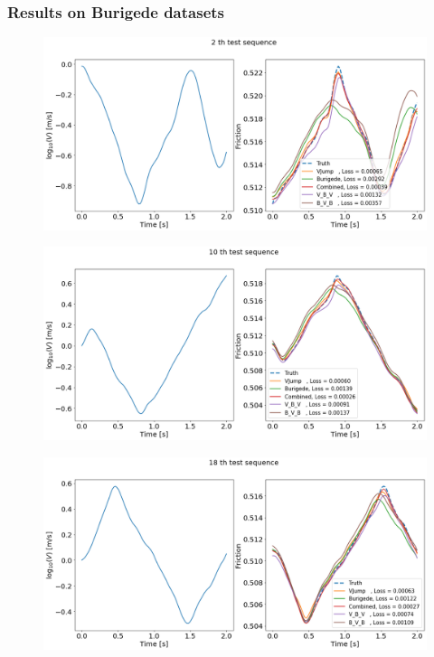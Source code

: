 \subsubsection{Results on Burigede datasets}
\begin{figure}[H]
    \centering
    \includegraphics[width=1.0\textwidth]{./images/Trial0112_Burigede2.png}
\end{figure}
\begin{figure}[H]
    \centering
    \includegraphics[width=1.0\textwidth]{./images/Trial0112_Burigede10.png}
\end{figure}
\begin{figure}[H]
    \centering
    \includegraphics[width=1.0\textwidth]{./images/Trial0112_Burigede18.png}
\end{figure}
